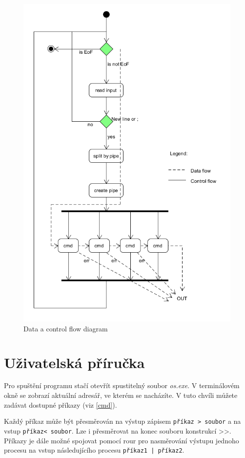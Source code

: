 \documentclass[a4paper]{article}
\begin{document}
\begin{figure}[!h] 
\centering
 \includegraphics[width=1\textwidth]{./flow2.png}
\caption{Data a control flow diagram}
\end{figure}


\section{Uživatelská příručka}
Pro spuštění programu stačí otevřít spustitelný soubor \emph{os.exe}. V terminálovém okně se zobrazí aktuální adresář, ve kterém se nacházíte. V tuto chvíli můžete zadávat dostupné příkazy (viz \ref{cmd}).


Každý příkaz může být přesměrován na výstup zápisem  \verb+příkaz > soubor+ a na vstup  \verb+příkaz< soubor+. Lze i přesměrovat na konec souboru konstrukcí \textgreater\textgreater. Příkazy je dále možné spojovat pomocí rour pro nasměrování výstupu jednoho procesu na vstup následujícího procesu  \verb+příkaz1 | příkaz2+.
\end{document}
